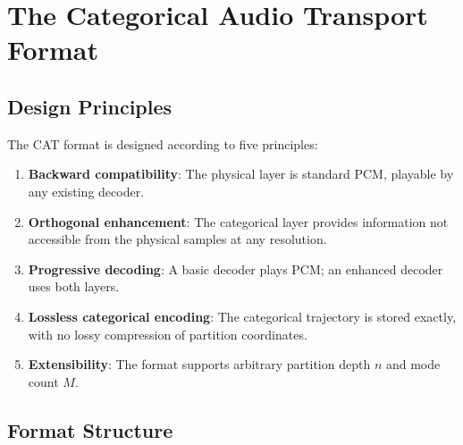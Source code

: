 \documentclass[twocolumn,10pt]{article}
\theoremstyle{remark}
\begin{document}
\section{The Categorical Audio Transport Format}
\label{sec:format}

\subsection{Design Principles}

The CAT format is designed according to five principles:

\begin{enumerate}
    \item \textbf{Backward compatibility}: The physical layer is standard PCM, playable by any existing decoder.
    \item \textbf{Orthogonal enhancement}: The categorical layer provides information not accessible from the physical samples at any resolution.
    \item \textbf{Progressive decoding}: A basic decoder plays PCM; an enhanced decoder uses both layers.
    \item \textbf{Lossless categorical encoding}: The categorical trajectory is stored exactly, with no lossy compression of partition coordinates.
    \item \textbf{Extensibility}: The format supports arbitrary partition depth $n$ and mode count $M$.
\end{enumerate}

\subsection{Format Structure}
\end{document}
